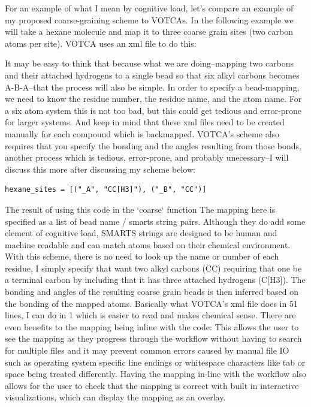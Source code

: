 For an example of what I mean by cognitive load, let's compare an example of my proposed coarse-graining scheme to VOTCAs.
In the following example we will take a hexane molecule and map it to three coarse grain sites (two carbon atoms per site).
VOTCA uses an xml file to do this:

It may be easy to think that because what we are doing--mapping two carbons and their attached hydrogens to a single bead so that six alkyl carbons becomes A-B-A--that the process will also be simple.
In order to specify a bead-mapping, we need to know the residue number, the residue name, and the atom name.
For a six atom system this is not too bad, but this could get tedious and error-prone for larger systems.
And keep in mind that these xml files need to be created manually for each compound which is backmapped.
VOTCA's scheme also requires that you specify the bonding and the angles resulting from those bonds, another process which is tedious, error-prone, and probably unecessary--I will discuss this more after discussing my scheme below:
\begin{lstlisting}
hexane_sites = [("_A", "CC[H3]"), ("_B", "CC")]
\end{lstlisting}
The result of using this code in the `coarse` function %
The mapping here is specified as a list of bead name / smarts string pairs.
Although they do add some element of cognitive load, SMARTS strings are designed to be human and machine readable and can match atoms based on their chemical environment.
With this scheme, there is no need to look up the name or number of each residue, I simply specify that want two alkyl carbons (CC) requiring that one be a terminal carbon by including that it has three attached hydrogens (C[H3]).
The bonding and angles of the resulting coarse grain beads is then inferred based on the bonding of the mapped atoms.
Basically what VOTCA's xml file does in 51 lines, I can do in 1 which is easier to read and makes chemical sense. 
There are even benefits to the mapping being inline with the code:
This allows the user to see the mapping as they progress through the workflow without having to search for multiple files and it may prevent common errors caused by manual file IO such as operating system specific line endings or whitespace characters like tab or space being treated differently.
Having the mapping in-line with the workflow also allows for the user to check that the mapping is correct with built in interactive visualizations, which can display the mapping as an overlay. %

